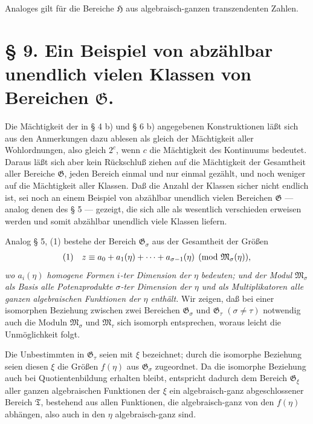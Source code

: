 Analoges gilt für die Bereiche $\mathfrak H$ aus algebraisch-ganzen
transzendenten Zahlen.

\section*{§ 9. Ein Beispiel von abzählbar unendlich vielen Klassen von Bereichen $\mathfrak G$.}

Die Mächtigkeit der in § 4 b) und § 6 b) angegebenen Konstruktionen läßt sich
aus den Anmerkungen dazu ablesen als gleich der Mächtigkeit aller Wohlordnungen,
also gleich $2^c$, wenn $c$ die Mächtigkeit des Kontinuums bedeutet. Daraus läßt
sich aber kein Rückschluß ziehen auf die Mächtigkeit der Gesamtheit aller
Bereiche $\mathfrak G$, jeden Bereich einmal und nur einmal gezählt, und noch
weniger auf die Mächtigkeit aller Klassen. Daß die Anzahl der Klassen sicher
nicht endlich ist, sei noch an einem Beispiel von abzählbar unendlich vielen
Bereichen $\mathfrak G$ --- analog denen des § 5 --- gezeigt, die sich alle als
wesentlich verschieden erweisen werden und somit abzählbar unendlich viele
Klassen liefern.

Analog § 5, (1) bestehe der Bereich $\mathfrak G_\sigma$ aus der Gesamtheit der
Größen
\[
\begin{array}{@{}l@{\quad}l@{}}
(1)& \displaystyle z\equiv a_0+a_1(\eta)+\cdots+a_{\sigma-1}(\eta)
 \pmod{\mathfrak M_\sigma(\eta)},
\end{array}
\]
\emph{wo $a_i(\eta)$ homogene Formen $i$-ter Dimension der $\eta$ bedeuten; und
der Modul $\mathfrak M_\sigma$ als Basis alle Potenzprodukte $\sigma$-ter
Dimension der $\eta$ und als Multiplikatoren
alle ganzen algebraischen Funktionen der $\eta$ enthält.} Wir zeigen, daß bei
einer isomorphen Beziehung zwischen zwei Bereichen $\mathfrak G_\sigma$ und
$\mathfrak G_\tau$ $(\sigma\ne\tau)$ notwendig auch die Moduln
$\mathfrak M_\sigma$ und $\mathfrak M_\tau$ sich isomorph entsprechen, woraus
leicht die Unmöglichkeit folgt.

Die Unbestimmten in $\mathfrak G_\tau$ seien mit $\xi$ bezeichnet; durch die
isomorphe Beziehung seien diesen $\xi$ die Größen $f(\eta)$ aus
$\mathfrak G_\sigma$ zugeordnet. Da die isomorphe Beziehung auch bei
Quotientenbildung erhalten bleibt, entspricht dadurch dem Bereich
$\mathfrak G_\xi$ aller ganzen algebraischen Funktionen der $\xi$ ein
algebraisch-ganz abgeschlossener Bereich $\mathfrak T$, bestehend aus allen
Funktionen, die algebraisch-ganz von den $f(\eta)$ abhängen, also auch in den
$\eta$ algebraisch-ganz sind.

